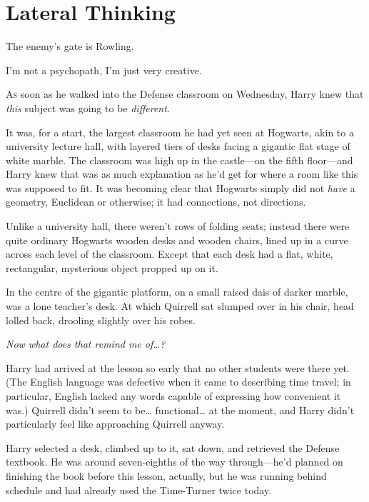 \chapter{Lateral Thinking}

\begin{chapterOpeningAuthorNote}
The enemy's gate is Rowling.
\end{chapterOpeningAuthorNote}
\begin{chapterOpeningQuote}
I'm not a psychopath, I'm just very creative.
\end{chapterOpeningQuote}

\lettrine{A}{s} soon as he walked into the Defense classroom on Wednesday, Harry knew that \emph{this} subject was going to be \emph{different}.

It was, for a start, the largest classroom he had yet seen at Hogwarts, akin to a university lecture hall, with layered tiers of desks facing a gigantic flat stage of white marble. The classroom was high up in the castle—on the fifth floor—and Harry knew that was as much explanation as he'd get for where a room like this was supposed to fit. It was becoming clear that Hogwarts simply did not \emph{have} a geometry, Euclidean or otherwise; it had connections, not directions.

Unlike a university hall, there weren't rows of folding seats; instead there were quite ordinary Hogwarts wooden desks and wooden chairs, lined up in a curve across each level of the classroom. Except that each desk had a flat, white, rectangular, mysterious object propped up on it.

In the centre of the gigantic platform, on a small raised dais of darker marble, was a lone teacher's desk. At which Quirrell sat slumped over in his chair, head lolled back, drooling slightly over his robes.

\emph{Now what does that remind me of{\ldots}?}

Harry had arrived at the lesson so early that no other students were there yet. (The English language was defective when it came to describing time travel; in particular, English lacked any words capable of expressing how convenient it was.) Quirrell didn't seem to be{\ldots} functional{\ldots} at the moment, and Harry didn't particularly feel like approaching Quirrell anyway.

Harry selected a desk, climbed up to it, sat down, and retrieved the Defense textbook. He was around seven-eighths of the way through—he'd planned on finishing the book before this lesson, actually, but he was running behind schedule and had already used the Time-Turner twice today.

